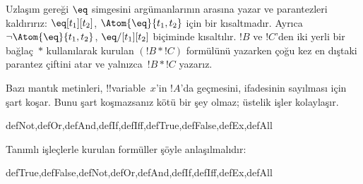 Uzlaşım gereği $\eq$ simgesini argümanlarının arasına yazar ve
parantezleri kaldırırız: $\eq[t_1][t_2]$,
$\Atom{\eq}{t_1,t_2}$ için bir kısaltmadır. Ayrıca
$\lnot \Atom{\eq}{t_1,t_2}$, $\eq/[t_1][t_2]$ biçiminde kısaltılır.
$!B$ ve $!C$'den iki yerli bir bağlaç~$\ast$ kullanılarak kurulan
$(!B \ast !C)$ formülünü yazarken çoğu kez en dıştaki parantez çiftini
atar ve yalnızca~$!B \ast !C$ yazarız.

\begin{intro}
Bazı mantık metinleri, !!{variable}~$x$'in $!A$'da geçmesini,
%
%
%
ifadesinin
sayılması için şart koşar.
Bunu şart koşmazsanız kötü bir şey olmaz; üstelik işler kolaylaşır.
\end{intro}

\begin{tagblock}{defNot,defOr,defAnd,defIf,defIff,defTrue,defFalse,defEx,defAll}
\begin{defn}
Tanımlı işleçlerle kurulan formüller şöyle anlaşılmalıdır:

\begin{tagenumerate}{defTrue,defFalse,defNot,defOr,defAnd,defIf,defIff,defEx,defAll}









\end{tagenumerate}
\end{defn}
\end{tagblock}

